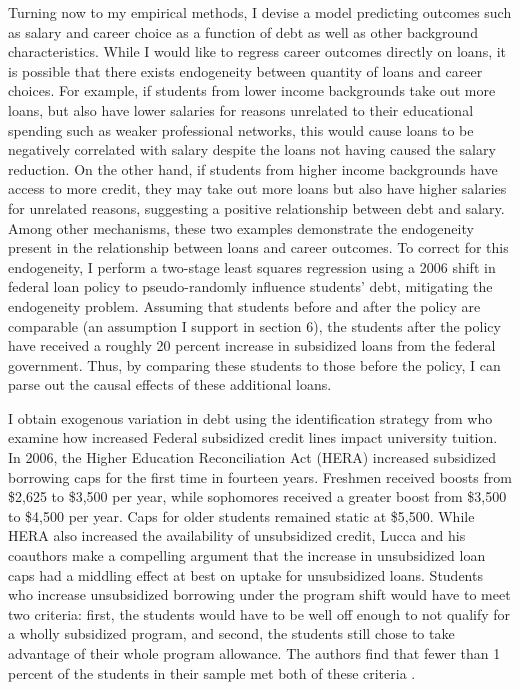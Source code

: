 \documentclass[12pt]{article}
\begin{document}
	Turning now to my empirical methods, I devise a model predicting outcomes such as salary and career choice as a function of debt as well as other background characteristics. While I would like to regress career outcomes directly on loans, it is possible that there exists endogeneity between quantity of loans and career choices. For example, if students from lower income backgrounds take out more loans, but also have lower salaries for reasons unrelated to their educational spending such as weaker professional networks, this would cause loans to be negatively correlated with salary despite the loans not having caused the salary reduction. On the other hand, if students from higher income backgrounds have access to more credit, they may take out more loans but also have higher salaries for unrelated reasons, suggesting a positive relationship between debt and salary. Among other mechanisms, these two examples demonstrate the endogeneity present in the relationship between loans and career outcomes. To correct for this endogeneity, I perform a two-stage least squares regression using a 2006 shift in federal loan policy to pseudo-randomly influence students' debt, mitigating the endogeneity problem. Assuming that students before and after the policy are comparable (an assumption I support in section 6), the students after the policy have received a roughly 20 percent increase in subsidized loans from the federal government. Thus, by comparing these students to those before the policy, I can parse out the causal effects of these additional loans.
	
	I obtain exogenous variation in debt using the identification strategy from \textcite{lucca2018} who examine how increased Federal subsidized credit lines impact university tuition. In 2006, the Higher Education Reconciliation Act (HERA) increased subsidized borrowing caps for the first time in fourteen years. Freshmen received boosts from \$2,625 to \$3,500 per year, while sophomores received a greater boost from \$3,500 to \$4,500 per year. Caps for older students remained static at \$5,500. While HERA also increased the availability of unsubsidized credit, Lucca and his coauthors make a compelling argument that the increase in unsubsidized loan caps had a middling effect at best on uptake for unsubsidized loans. Students who increase unsubsidized borrowing under the program shift would have to meet two criteria: first, the students would have to be well off enough to not qualify for a wholly subsidized program, and second, the students still chose to take advantage of their whole program allowance. The authors find that fewer than 1 percent of the students in their sample met both of these criteria \parencite[p. 434]{lucca2018}.
	
\end{document}
